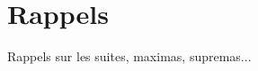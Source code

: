 \chapter{Rappels}

\justify

\setlength{\parindent}{0pt}


Rappels sur les suites, maximas, supremas...